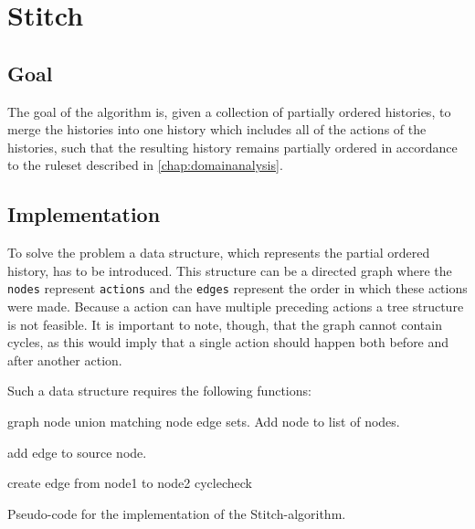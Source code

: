 
\section{Stitch}
\subsection{Goal} %
The goal of the algorithm is, given a collection of partially ordered histories, to merge the histories into one history which includes all of the actions of the histories, such that the resulting history remains partially ordered in accordance to the ruleset described in \autoref{chap:domainanalysis}.


\subsection{Implementation} %
To solve the problem a data structure, which represents the partial ordered history, has to be introduced. This structure can be  a directed graph where the \texttt{nodes} represent \texttt{actions} and the \texttt{edges} represent the order in which these actions were made. Because a action can have multiple preceding actions a tree structure is not feasible. It is important to note, though, that the graph cannot contain cycles, as this would imply that a single action should happen both before and after another action.

\newpar Such a data structure requires the following functions:
\begin{algorithm}
\begin{algorithmic}
 {graph node}
	    \State union matching node edge sets.
	\Else
	    \State Add node to list of nodes.
	\EndIf
\EndFunction

\State\State

	\State add edge to source node.
\EndFunction

\State\State

		\State{}
	\EndFor
\EndFor
{}
				\State create edge from node1 to node2
			\EndIf
		\EndIf
	\EndFor
\EndFor
\State cyclecheck
\EndFunction
\end{algorithmic}
\caption{Pseudo-code for the implementation of the Stitch-algorithm.}
\end{algorithm}

